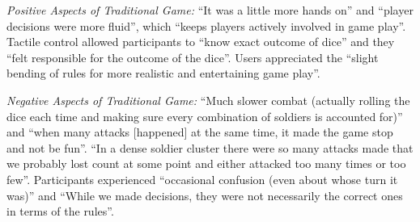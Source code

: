 
{\em Positive Aspects of Traditional Game:} %
%
%
%
``It was a little more hands on'' and
``player decisions were more fluid'', which
``keeps players actively involved in game play''.
%
Tactile control allowed participants to ``know exact outcome of dice''
and they ``felt responsible for the outcome of the
dice''.
%
Users appreciated the
``slight bending of rules for more realistic and entertaining game play''.




{\em Negative Aspects of Traditional Game:} %
%
%
%
``Much slower combat (actually rolling the dice each time and making sure every combination of soldiers is accounted for)''
and
``when many attacks [happened] at the same time, it made the game stop and not be fun''.
%
``In a dense soldier cluster there were so many attacks made that we probably lost count at some point and either attacked too many times or too few''.
Participants experienced ``occasional confusion (even about whose turn it was)''
%
and ``While we made decisions, they were not necessarily the
correct ones in terms of the rules''.

